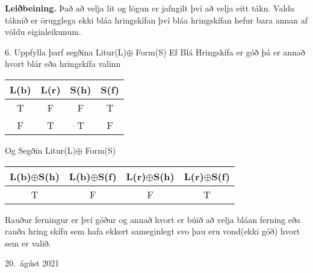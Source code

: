 \documentclass[12pt]{article}
\begin{document}
  {\bf Leiðbeining.}  Það að velja lit og lögun er jafngilt því að velja eitt tákn.  Valda táknið er örugglega ekki bláa hringskífan því bláa hringskífan hefur bara annan af völdu eiginleikunum.

6. Uppfylla þarf segðina Litur(L)$\oplus$ Form(S)
\newline Ef Blá Hringskífa er góð þá er annað  hvort blár eða hringskífa valinn

\begin{center}
    \begin{tabular}{||c c c c||} 
     \hline
     L(b) & L(r) & S(h) & S(f) \\ [0.5ex] 
     \hline\hline
     T & F & F & T \\ 
     \hline 
     \hline
     F & T & T & F \\ 
     \hline 
     
    \end{tabular}
    \end{center}

Og Segðin Litur(L)$\oplus$ Form(S)
\newline
\begin{center}
    \begin{tabular}{||c c c c||} 
	\hline
	L(b)$\oplus$S(h) & L(b)$\oplus$S(f) & L(r)$\oplus$S(h) & L(r)$\oplus$S(f) \\ [0.5ex] 
	\hline\hline
	T & F & F & T \\ 

	\hline 
	\hline
\end{tabular}
\end{center}
Rauður ferningur er því góður og annað hvort er búið að velja bláan ferning eða rauða hring skífu sem hafa ekkert sameginlegt svo þau eru vond(ekki góð) hvort sem er valið.




\vfill  20.~ágúst 2021
\hfill  
\end{document}
